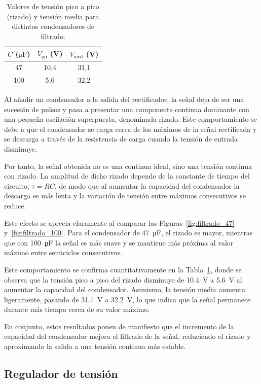 \documentclass[a4paper,12pt]{article}
\begin{document}
\begin{table}[H]
\centering
\begin{tabular}{ccc}
\hline
$C$ ($\si{\micro\farad}$) & $V_{\text{pp}}$ (V) & $V_{\text{med}}$ (V) \\
\hline
47  & 10,4 & 31,1 \\
100 & 5,6  & 32,2 \\
\hline
\end{tabular}
\caption{Valores de tensión pico a pico (rizado) y tensión media para distintos condensadores de filtrado.}
\label{tab:filtrado}
\end{table}

Al añadir un condensador a la salida del rectificador, la señal deja de ser una sucesión de pulsos y pasa a presentar una componente continua dominante con una pequeña oscilación superpuesta, denominada rizado. Este comportamiento se debe a que el condensador se carga cerca de los máximos de la señal rectificada y se descarga a través de la resistencia de carga cuando la tensión de entrada disminuye.

Por tanto, la señal obtenida no es una continua ideal, sino una tensión continua con rizado. La amplitud de dicho rizado depende de la constante de tiempo del circuito, \(\tau = RC\), de modo que al aumentar la capacidad del condensador la descarga es más lenta y la variación de tensión entre máximos consecutivos se reduce.

Este efecto se aprecia claramente al comparar las Figuras~\ref{fig:filtrado_47} y~\ref{fig:filtrado_100}. Para el condensador de \SI{47}{\micro\farad}, el rizado es mayor, mientras que con \SI{100}{\micro\farad} la señal es más suave y se mantiene más próxima al valor máximo entre semiciclos consecutivos.

Este comportamiento se confirma cuantitativamente en la Tabla~\ref{tab:filtrado}, donde se observa que la tensión pico a pico del rizado disminuye de \SI{10,4}{\volt} a \SI{5,6}{\volt} al aumentar la capacidad del condensador. Asimismo, la tensión media aumenta ligeramente, pasando de \SI{31,1}{\volt} a \SI{32,2}{\volt}, lo que indica que la señal permanece durante más tiempo cerca de su valor máximo.

En conjunto, estos resultados ponen de manifiesto que el incremento de la capacidad del condensador mejora el filtrado de la señal, reduciendo el rizado y aproximando la salida a una tensión continua más estable.

\subsection{Regulador de tensión}
\end{document}
